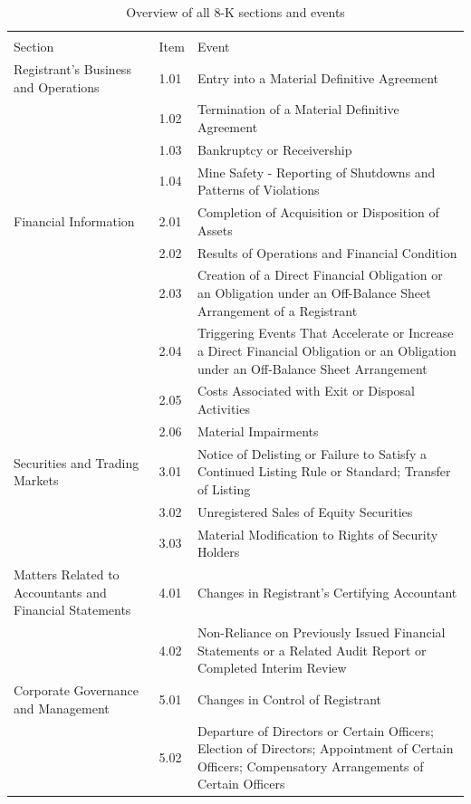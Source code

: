 \documentclass{article}
\begin{document}
	
	\begin{table}[h!]
	\centering
	\caption{Overview of all 8-K sections and events}
	\label{table:8kevents}
	
	\begin{tabularx}{\textwidth}{|X|l|X|}
		\toprule
		&      &                                   \\
		Section & Item & Event \\
		\midrule
		Registrant's Business and Operations & 1.01 & Entry into a Material Definitive Agreement \\
		& 1.02 & Termination of a Material Definitive Agreement \\
		& 1.03 & Bankruptcy or Receivership \\
		& 1.04 & Mine Safety - Reporting of Shutdowns and Patterns of Violations \\
		Financial Information & 2.01 & Completion of Acquisition or Disposition of Assets \\
		& 2.02 & Results of Operations and Financial Condition \\
		& 2.03 & Creation of a Direct Financial Obligation or an Obligation under an Off-Balance Sheet Arrangement of a Registrant \\
		& 2.04 & Triggering Events That Accelerate or Increase a Direct Financial Obligation or an Obligation under an Off-Balance Sheet Arrangement \\
		& 2.05 & Costs Associated with Exit or Disposal Activities \\
		& 2.06 & Material Impairments \\
		Securities and Trading Markets & 3.01 & Notice of Delisting or Failure to Satisfy a Continued Listing Rule or Standard; Transfer of Listing \\
		& 3.02 & Unregistered Sales of Equity Securities \\
		& 3.03 & Material Modification to Rights of Security Holders \\
		Matters Related to Accountants and Financial Statements & 4.01 & Changes in Registrant's Certifying Accountant \\
		& 4.02 & Non-Reliance on Previously Issued Financial Statements or a Related Audit Report or Completed Interim Review \\
		Corporate Governance and Management & 5.01 & Changes in Control of Registrant \\
		& 5.02 & Departure of Directors or Certain Officers; Election of Directors; Appointment of Certain Officers; Compensatory Arrangements of Certain Officers \\

\end{tabularx}
\end{table}
\end{document}
